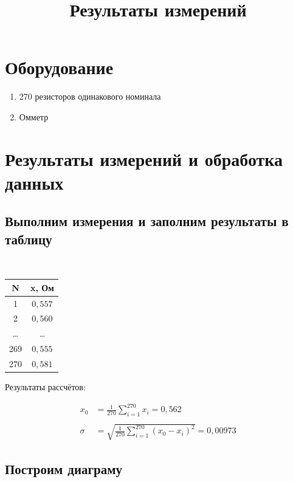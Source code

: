 \documentclass[a4paper, 12pt]{article}
\begin{document}
\section{Оборудование}

\begin{enumerate}
	\item {270 резисторов одинакового номинала}
	\item {Омметр}
\end{enumerate}

\section {Результаты измерений и обработка данных}

\subsection {Выполним измерения и заполним результаты в таблицу}

\begin{center}
\title{Результаты измерений} \\
\begin{tabular}{| c | c |}
	\hline      
	N &x, Ом      \\
	\hline      
	1 &$0,557$    \\
	\hline      
	2 &$0,560$    \\
	\hline      
	\dots &\dots  \\
	\hline
	269 &$0,555$  \\
	\hline      
	270 &$0,581$  \\
	\hline 
\end{tabular}
\end{center}

Результаты рассчётов:

\begin{align*}
	x_0 &= \frac{1}{270}\sum_{i=1}^{270} x_i = 0,562 \\ 
	\\
	\sigma &= \sqrt{\frac{1}{270}\sum_{i=1}^{270} (x_0 - x_i)^2} = 0,00973 
\end{align*}

\subsection{Построим диаграму}
\end{document}
